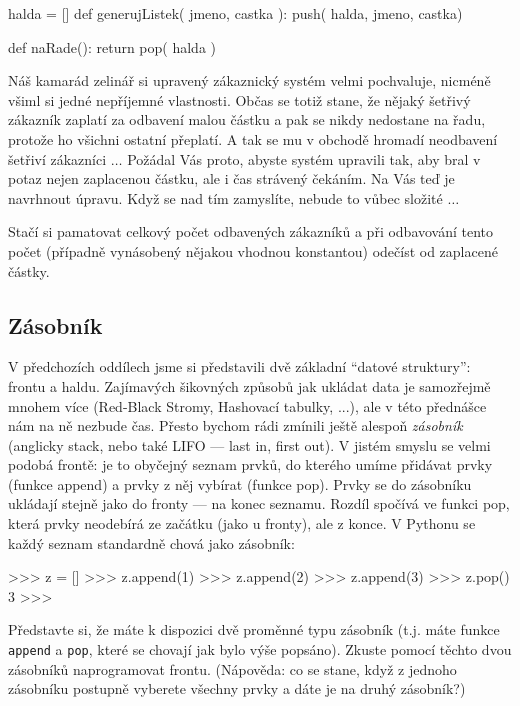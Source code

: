 \begin{python}
halda = []
def generujListek( jmeno, castka ):
  push( halda, jmeno, castka)

def naRade():
  return pop( halda ) 
\end{python}

\begin{cviceni} Náš kamarád zelinář si upravený zákaznický systém velmi pochvaluje, nicméně všiml si jedné nepříjemné vlastnosti.
Občas se totiž stane, že nějaký šetřivý zákazník zaplatí za odbavení malou částku a pak se nikdy nedostane na řadu, protože ho
všichni ostatní přeplatí. A tak se mu v obchodě hromadí neodbavení šetřiví zákazníci $\ldots$ Požádal Vás proto, abyste systém
upravili tak, aby bral v potaz nejen zaplacenou částku, ale i čas strávený čekáním. Na Vás teď je navrhnout úpravu. Když se nad
tím zamyslíte, nebude to vůbec složité $\ldots$
\end{cviceni}

\begin{reseni}
Stačí si pamatovat celkový počet odbavených zákazníků a při odbavování tento počet (případně vynásobený nějakou vhodnou konstantou)
odečíst od zaplacené částky. 
\end{reseni}

\subsection*{Zásobník} 

V předchozích oddílech jsme si představili dvě základní ``datové struktury'': 
frontu a haldu. Zajímavých šikovných způsobů jak ukládat data je samozřejmě 
mnohem více  (Red-Black Stromy, Hashovací tabulky, ...), ale v této přednášce 
nám na ně nezbude čas. Přesto bychom rádi zmínili ještě alespoň \emph{zásobník} 
(anglicky stack, nebo také LIFO --- last in, first out). V jistém smyslu se 
velmi podobá frontě: je to obyčejný seznam prvků, do kterého umíme přidávat 
prvky (funkce append) a prvky z něj vybírat (funkce pop). Prvky se do zásobníku
ukládají stejně jako do fronty --- na konec seznamu. Rozdíl spočívá ve funkci
pop, která prvky neodebírá ze začátku (jako u fronty), ale z konce. V Pythonu
se každý seznam standardně chová jako zásobník:

\begin{python}
>>> z = []
>>> z.append(1)
>>> z.append(2)
>>> z.append(3)
>>> z.pop()
3
>>> 
\end{python}

\begin{cviceni} Představte si, že máte k dispozici dvě proměnné typu zásobník
(t.j. máte funkce {\tt append} a {\tt pop}, které se chovají jak bylo výše popsáno).
Zkuste pomocí těchto dvou zásobníků naprogramovat frontu. (Nápověda: co se stane,
když z jednoho zásobníku postupně vyberete všechny prvky a dáte je na druhý zásobník?)
\end{cviceni}

\begin{reseni}
\end{reseni}


\ifx\ucebnice\undefined

\fi